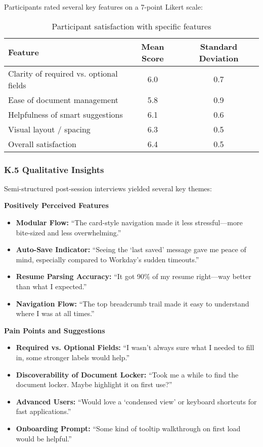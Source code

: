 \documentclass[
	letterpaper, %
]{jdf}
\begin{document}
\begin{sloppypar}
Participants rated several key features on a 7-point Likert scale:

\begin{table}[h]
\centering
\begin{tabular}{|l|c|c|}
\hline
\textbf{Feature} & \textbf{Mean Score} & \textbf{Standard Deviation} \\
\hline
Clarity of required vs. optional fields & 6.0 & 0.7 \\
Ease of document management & 5.8 & 0.9 \\
Helpfulness of smart suggestions & 6.1 & 0.6 \\
Visual layout / spacing & 6.3 & 0.5 \\
Overall satisfaction & 6.4 & 0.5 \\
\hline
\end{tabular}
\caption{Participant satisfaction with specific features}
\end{table}

\subsubsection{K.5 Qualitative Insights}

Semi-structured post-session interviews yielded several key themes:

\textbf{Positively Perceived Features}
\begin{itemize}
    \item \textbf{Modular Flow:} “The card-style navigation made it less stressful—more bite-sized and less overwhelming.”
    \item \textbf{Auto-Save Indicator:} “Seeing the ‘last saved’ message gave me peace of mind, especially compared to Workday’s sudden timeouts.”
    \item \textbf{Resume Parsing Accuracy:} “It got 90\% of my resume right—way better than what I expected.”
    \item \textbf{Navigation Flow:} “The top breadcrumb trail made it easy to understand where I was at all times.”
\end{itemize}

\textbf{Pain Points and Suggestions}
\begin{itemize}
    \item \textbf{Required vs. Optional Fields:} “I wasn't always sure what I needed to fill in, some stronger labels would help.”
    \item \textbf{Discoverability of Document Locker:} “Took me a while to find the document locker. Maybe highlight it on first use?”
    \item \textbf{Advanced Users:} “Would love a ‘condensed view’ or keyboard shortcuts for fast applications.”
    \item \textbf{Onboarding Prompt:} “Some kind of tooltip walkthrough on first load would be helpful.”
\end{itemize}


\end{sloppypar}
\end{document}
